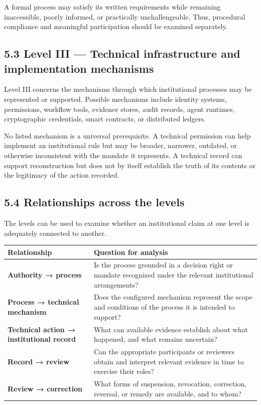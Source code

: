 \documentclass[
  10pt,
]{article}
\newcounter{none} %
\begin{document}
A formal process may satisfy its written requirements while remaining
inaccessible, poorly informed, or practically unchallengeable. Thus,
procedural compliance and meaningful participation should be examined
separately.

\subsection{5.3 Level III --- Technical infrastructure and
implementation
mechanisms}\label{level-iii-technical-infrastructure-and-implementation-mechanisms}

Level III concerns the mechanisms through which institutional processes
may be represented or supported. Possible mechanisms include identity
systems, permissions, workflow tools, evidence stores, audit records,
agent runtimes, cryptographic credentials, smart contracts, or
distributed ledgers.

No listed mechanism is a universal prerequisite. A technical permission
can help implement an institutional rule but may be broader, narrower,
outdated, or otherwise inconsistent with the mandate it represents. A
technical record can support reconstruction but does not by itself
establish the truth of its contents or the legitimacy of the action
recorded.

\subsection{5.4 Relationships across the
levels}\label{relationships-across-the-levels}

The levels can be used to examine whether an institutional claim at one
level is adequately connected to another.

{\def\LTcaptype{none} %
\setlength{\parskip}{0pt}\begin{longtable}[]{@{}
  >{\raggedright\arraybackslash}p{}
  >{\raggedright\arraybackslash}p{}@{}}
\toprule\noalign{}
Relationship & Question for analysis \\
\midrule\noalign{}
\endhead
\bottomrule\noalign{}
\endlastfoot
\textbf{Authority → process} & Is the process grounded in a decision
right or mandate recognized under the relevant institutional
arrangements? \\
\textbf{Process → technical mechanism} & Does the configured mechanism
represent the scope and conditions of the process it is intended to
support? \\
\textbf{Technical action → institutional record} & What can available
evidence establish about what happened, and what remains uncertain? \\
\textbf{Record → review} & Can the appropriate participants or reviewers
obtain and interpret relevant evidence in time to exercise their
roles? \\
\textbf{Review → correction} & What forms of suspension, revocation,
correction, reversal, or remedy are available, and to whom? \\
\end{longtable}
}
\end{document}
